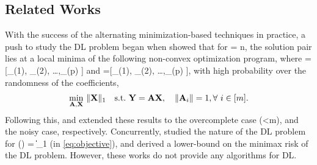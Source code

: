 \documentclass{article}
\def\[#1\]{{$#1$}}
\def\b#1{{\mathbf{#1}}}
\begin{document}
 











\vspace{-3pt}
\subsection{Related Works}
\vspace{-3pt}






With the success of the alternating minimization-based techniques in practice, a push to study the DL problem began when \cite{Remi2010} showed that for \[m = n\], the solution pair \[\rbr{\b{A}^*, \b{X}^*}\] lies at a local minima of the following non-convex optimization program, where \[\b{X}=[\b{x}_{(1)}, \b{x}_{(2)}, \dots,\b{x}_{(p)} ]\] and \[\b{Y}=[\b{y}_{(1)}, \b{y}_{(2)}, \dots,\b{y}_{(p)} ]\], with high probability over the randomness of the coefficients,
\begin{align}\label{eq:alt_min_obj}
\underset{\b{A}, \b{X}}{\rm min}~\|\b{X}\|_1 ~~~\text{s.t.}~ \b{Y} = \b{AX}, ~~~\|\b{A}_i\| = 1, \forall ~i \in [m].
\end{align}
Following this, \cite{Geng2014} and \cite{Jenatton2012} extended these results to the overcomplete case (\[n<m\]), and the noisy case, respectively. Concurrently, \cite{Jung2014, Jung2016} studied the nature of the DL problem for \[S(\cdot) = \|\cdot\|_1\] (in \eqref{eq:objective}), and derived a lower-bound on the minimax risk of the DL problem. However, these works do not provide any algorithms for DL.
\end{document}
